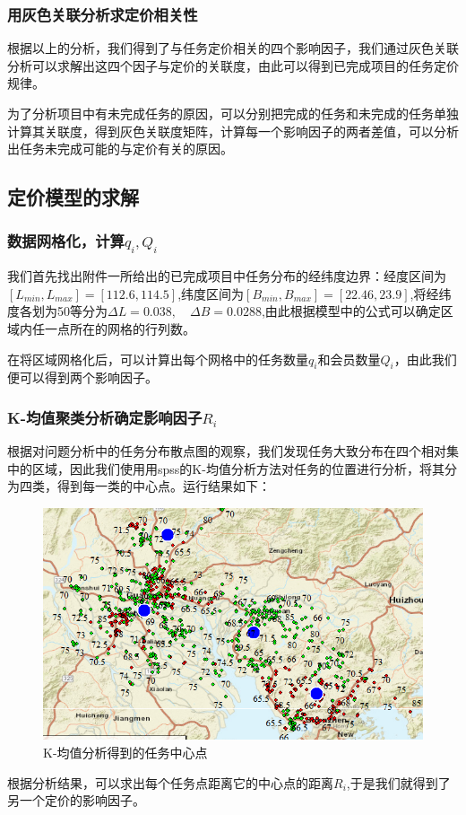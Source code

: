 \documentclass[withoutpreface,bwprint]{cumcmthesis} %
\begin{document}
\subsubsection{用灰色关联分析求定价相关性}

根据以上的分析，我们得到了与任务定价相关的四个影响因子，我们通过灰色关联分析可以求解出这四个因子与定价的关联度，由此可以得到已完成项目的任务定价规律。

为了分析项目中有未完成任务的原因，可以分别把完成的任务和未完成的任务单独计算其关联度，得到灰色关联度矩阵，计算每一个影响因子的两者差值，可以分析出任务未完成可能的与定价有关的原因。

\subsection{定价模型的求解}
\subsubsection{数据网格化，计算$q_i,Q_i$}

我们首先找出附件一所给出的已完成项目中任务分布的经纬度边界：经度区间为$[L_{min},L_{max}]=[112.6,114.5]$,纬度区间为$[B_{min},B_{max}]=[22.46,23.9]$,将经纬度各划为50等分为$\Delta L=0.038,\quad \Delta B=0.0288$,由此根据模型中的公式可以确定区域内任一点所在的网格的行列数。

在将区域网格化后，可以计算出每个网格中的任务数量$q_i$和会员数量$Q_i$，由此我们便可以得到两个影响因子。

\subsubsection{K-均值聚类分析确定影响因子$R_i$}

根据对问题分析中的任务分布散点图的观察，我们发现任务大致分布在四个相对集中的区域，因此我们使用用spss的K-均值分析方法对任务的位置进行分析，将其分为四类，得到每一类的中心点。运行结果如下：
\begin{figure}[H]
    \centering
    \includegraphics[width=1\textwidth]{2.png} 
    \caption{K-均值分析得到的任务中心点} 
    \label{图} 
\end{figure}
根据分析结果，可以求出每个任务点距离它的中心点的距离$R_i$,于是我们就得到了另一个定价的影响因子。
\end{document}
